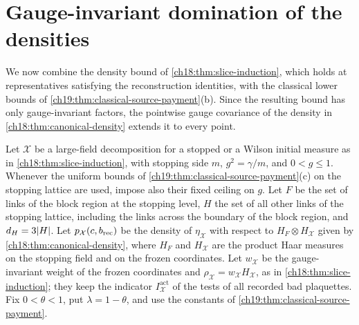 \section{Gauge-invariant domination of the densities}\label{ch19:sec:envelope}

We now combine the density bound of \cref{ch18:thm:slice-induction}, which holds at representatives satisfying the reconstruction identities, with the classical lower bounds of \cref{ch19:thm:classical-source-payment}(b). Since the resulting bound has only gauge-invariant factors, the pointwise gauge covariance of the density in \cref{ch18:thm:canonical-density} extends it to every point.

\begin{theorem}\label{ch19:thm:invariant-wilson-envelope}
Let $\mathcal X$ be a large-field decomposition for a stopped or a Wilson initial measure as in \cref{ch18:thm:slice-induction}, with stopping side $m$, $g^2=\gamma/m$, and $0<g\le1$. Whenever the uniform bounds of \cref{ch19:thm:classical-source-payment}(c) on the stopping lattice are used, impose also their fixed ceiling on $g$. Let $F$ be the set of links of the block region at the stopping level, $H$ the set of all other links of the stopping lattice, including the links across the boundary of the block region, and $d_H=3\lvert H\rvert$. Let $p_{\mathcal X}(c,b_{\mathrm{rec}})$ be the density of $\eta_{\mathcal X}$ with respect to $H_F\otimes H_{\mathcal X}$ given by \cref{ch18:thm:canonical-density}, where $H_F$ and $H_{\mathcal X}$ are the product Haar measures on the stopping field and on the frozen coordinates. Let $w_{\mathcal X}$ be the gauge-invariant weight of the frozen coordinates and $\rho_{\mathcal X}=w_{\mathcal X}H_{\mathcal X}$, as in \cref{ch18:thm:slice-induction}; they keep the indicator $I_{\mathcal X}^{\mathrm{act}}$ of the tests of all recorded bad plaquettes. Fix $0<\theta<1$, put $\lambda=1-\theta$, and use the constants of \cref{ch19:thm:classical-source-payment}.


\end{theorem}
